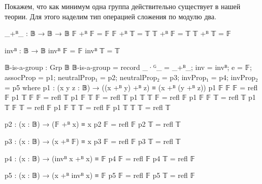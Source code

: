 \documentclass{article}[12pt]
\begin{document}
Покажем, что как минимум одна группа действительно существует в нашей теории. Для этого наделим
тип  операцией сложения по модулю два.
\begin{code}
_+ᴮ_ : 𝔹 → 𝔹 → 𝔹
𝔽 +ᴮ 𝔽 = 𝔽
𝔽 +ᴮ 𝕋 = 𝕋
𝕋 +ᴮ 𝔽 = 𝕋
𝕋 +ᴮ 𝕋 = 𝔽

invᴮ : 𝔹 → 𝔹
invᴮ 𝔽 = 𝔽
invᴮ 𝕋 = 𝕋

𝔹-is-a-group : Grp 𝔹
𝔹-is-a-group = record {_·ᴳ_ = _+ᴮ_;
                       inv = invᴮ;
                       e = 𝔽;
                       assocProp = p1;
                       neutralProp₁ = p2;
                       neutralProp₂ = p3;
                       invProp₁ = p4;
                       invProp₂ = p5}
    where
        p1 : (x y z : 𝔹) → ((x +ᴮ y) +ᴮ z) ≡ (x +ᴮ (y +ᴮ z))
        p1 𝔽 𝔽 𝔽 = refl 𝔽
        p1 𝕋 𝔽 𝔽 = refl 𝕋
        p1 𝔽 𝕋 𝔽 = refl 𝕋
        p1 𝕋 𝕋 𝔽 = refl 𝔽
        p1 𝔽 𝔽 𝕋 = refl 𝕋
        p1 𝕋 𝔽 𝕋 = refl 𝔽
        p1 𝔽 𝕋 𝕋 = refl 𝔽
        p1 𝕋 𝕋 𝕋 = refl 𝕋

        p2 : (x : 𝔹) → (𝔽 +ᴮ x) ≡ x
        p2 𝔽 = refl 𝔽
        p2 𝕋 = refl 𝕋

        p3 : (x : 𝔹) → (x +ᴮ 𝔽) ≡ x
        p3 𝔽 = refl 𝔽
        p3 𝕋 = refl 𝕋

        p4 : (x : 𝔹) → (invᴮ x +ᴮ x) ≡ 𝔽
        p4 𝔽 = refl 𝔽
        p4 𝕋 = refl 𝔽

        p5 : (x : 𝔹) → (x +ᴮ invᴮ x) ≡ 𝔽
        p5 𝔽 = refl 𝔽
        p5 𝕋 = refl 𝔽
\end{code}
\end{document}
